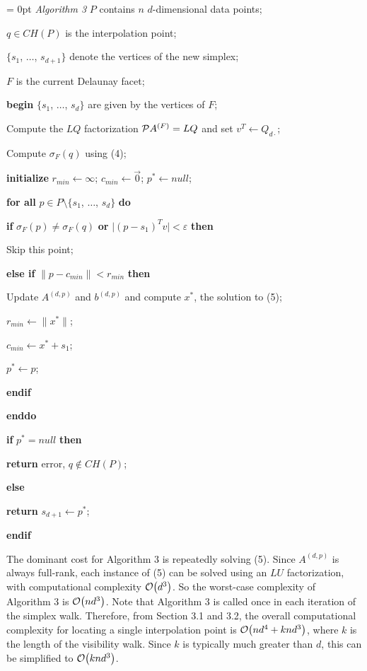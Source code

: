 {{\parindent =0pt \parskip= 0pt
\smallskip
\leftskip 20pt
{\sl Algorithm 3}
\smallskip
$P$ contains $n$ $d$-dimensional data points;\par
$q \in CH(P)$ is the interpolation point;\par
$\{s_1$, $\ldots$, $s_{d+1}\}$ denote the vertices of the new simplex;\par
$F$ is the current Delaunay facet;\par
\smallskip
{\bf begin}
$\{s_1$, $\ldots$, $s_d\}$ are given by the vertices of $F$;\par
Compute the $LQ$ factorization ${\cal P}A^{(F)}=LQ$
and set $v^T \leftarrow Q_{d\cdot}$; \par
Compute $\sigma_F(q)$ using (4); \par
{\bf initialize} $r_{min} \leftarrow \infty$;
$c_{min} \leftarrow {\vec 0}$;
$p^* \leftarrow null$;\par
{\bf for all} $p \in P \setminus \{s_1$, $\ldots$, $s_d\}$ {\bf do}\par
\leftskip 40pt
{\bf if} $\sigma_F(p) \neq \sigma_F(q)$ {\bf or} 
$\bigl|(p - s_1)^T v\bigr| < \varepsilon$ {\bf then}\par
\leftskip 60pt
Skip this point;\par
\leftskip 40pt
{\bf else if} $\|p - c_{min}\| < r_{min}$ {\bf then}\par
\leftskip 60pt
Update $A^{(d,p)}$ and $b^{(d,p)}$ and compute $x^*$, the solution to (5);\par
$r_{min} \leftarrow \|x^*\|$;\par
$c_{min} \leftarrow x^* + s_1$;\par
$p^* \leftarrow p$;\par
\leftskip 40pt
{\bf endif}\par
\leftskip 20pt
{\bf enddo}\par
{\bf if} $p^* = null$ {\bf then} \par
\leftskip 40pt
{\bf return} error, $q \not\in CH(P)$;\par
\leftskip 20pt
{\bf else}\par
\leftskip 40pt
{\bf return} $s_{d+1} \leftarrow p^*$;\par
\leftskip 20pt
{\bf endif}
\smallskip}

The dominant cost for Algorithm 3 is repeatedly solving (5). Since
$A^{(d,p)}$ is always full-rank, each instance of (5) can be solved
using an $LU$ factorization, with computational complexity
${\cal O}\big(d^3\big)$. So the worst-case complexity of Algorithm 3
is ${\cal O}\big(nd^3\big)$.
Note that Algorithm 3 is called once in each iteration of the simplex
walk. Therefore, from Section 3.1 and 3.2, the overall computational
complexity for locating a single interpolation point is
${\cal O}\big(nd^4 + knd^3\big)$, where $k$ is the length of the
visibility walk.
Since $k$ is typically much greater than $d$, this can be simplified
to ${\cal O}\big(knd^3\big)$.

}
